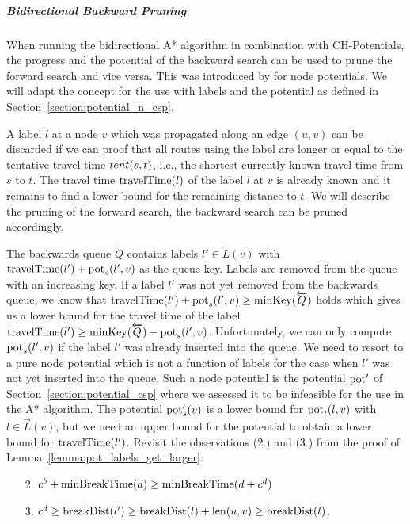 \subparagraph{Bidirectional Backward Pruning}
When running the bidirectional A* algorithm in combination with CH-Potentials, the progress and the potential of the backward search can be used to prune the forward search and vice versa. This was introduced by \cite{strasser:2018} for node potentials. We will adapt the concept for the use with labels and the potential as defined in Section~\ref{section:potential_n_csp}.

A label $l$ at a node $v$ which was propagated along an edge $(u,v)$ can be discarded if we can proof that all routes using the label are longer or equal to the tentative travel time $tent(s,t)$, i.e., the shortest currently known travel time from $s$ to $t$. The travel time $\operatorname{travelTime}(l)$ of the label $l$ at $v$ is already known and it remains to find a lower bound for the remaining distance to $t$. We will describe the pruning of the forward search, the backward search can be pruned accordingly.

The backwards queue $\overleftarrow{Q}$ contains labels $l' \in \overleftarrow{L}(v)$ with $\operatorname{travelTime}(l') + \operatorname{pot}_s(l', v)$ as the queue key. Labels are removed from the queue with an increasing key. If a label $l'$ was not yet removed from the backwards queue, we know that $\operatorname{travelTime}(l') + \operatorname{pot}_s(l',v) \ge \operatorname{minKey}(\overleftarrow{Q})$ holds which gives us a lower bound for the travel time of the label $\operatorname{travelTime}(l') \ge \operatorname{minKey}(\overleftarrow{Q}) - \operatorname{pot}_s(l',v)$. Unfortunately, we can only compute $\operatorname{pot}_s(l',v)$ if the label $l'$ was already inserted into the queue. We need to resort to a pure node potential which is not a function of labels for the case when $l'$ was not yet inserted into the queue. Such a node potential is the potential $\operatorname{pot}'$ of Section~\ref{section:potential_csp} where we assessed it to be infeasible for the use in the A* algorithm. The potential $\operatorname{pot}'_s(v)$ is a lower bound for $\operatorname{pot}_t(l,v)$ with $l \in \overrightarrow{L}(v)$, but we need an upper bound for the potential to obtain a lower bound for $\operatorname{travelTime}(l')$. Revisit the observations (2.) and (3.) from the proof of Lemma~\ref{lemma:pot_labels_get_larger}:

\begin{enumerate}
	\item[2.] $c^b + \operatorname{minBreakTime}(d) \ge \operatorname{minBreakTime}(d + c^d)$
	\item[3.] $c^d \ge \operatorname{breakDist}(l') \ge \operatorname{breakDist}(l) + \operatorname{len}(u,v) \ge \operatorname{breakDist}(l)$.
\end{enumerate}

